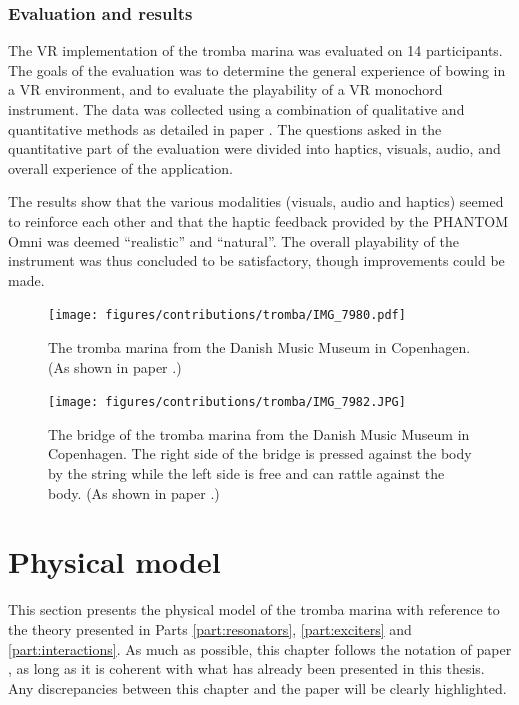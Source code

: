 \subsubsection{Evaluation and results}
The VR implementation of the tromba marina was evaluated on 14 participants. The goals of the evaluation was to determine the general experience of bowing in a VR environment, and to evaluate the playability of a VR monochord instrument.
The data was collected using a combination of qualitative and quantitative methods as detailed in paper \citeP[E]. The questions asked in the quantitative part of the evaluation were divided into haptics, visuals, audio, and overall experience of the application.

The results show that the various modalities (visuals, audio and haptics) seemed to reinforce each other and that the haptic feedback provided by the PHANTOM Omni was deemed ``realistic'' and ``natural''. The overall playability of the instrument was thus concluded to be satisfactory, though improvements could be made.

\begin{figure}
    \centering
    \texttt{[image: figures/contributions/tromba/IMG\_7980.pdf]}
    \caption{The tromba marina from the Danish Music Museum in Copenhagen. (As shown in paper \citeP[D].)}
\label{fig:tromba}
\end{figure}
  
\begin{figure}
    \centering
    \texttt{[image: figures/contributions/tromba/IMG\_7982.JPG]}
    \caption{The bridge of the tromba marina from the Danish Music Museum in Copenhagen. The right side of the bridge is pressed against the body by the string while the left side is free and can rattle against the body. (As shown in paper \citeP[D].)}
\label{fig:bridge}
\end{figure}

\section{Physical model}
This section presents the physical model of the tromba marina with reference to the theory presented in Parts \ref{part:resonators}, \ref{part:exciters} and \ref{part:interactions}.
As much as possible, this chapter follows the notation of paper \citeP[D], as long as it is coherent with what has already been presented in this thesis. Any discrepancies between this chapter and the paper will be clearly highlighted. 

